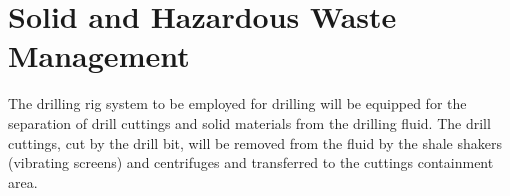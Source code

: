 \section*{Solid and Hazardous Waste Management}

The drilling rig system to be employed for drilling will be equipped for the separation of drill cuttings
and solid materials from the drilling fluid. The drill cuttings, cut by the drill bit, will be removed
from the fluid by the shale shakers (vibrating screens) and centrifuges and transferred to the cuttings
containment area.



